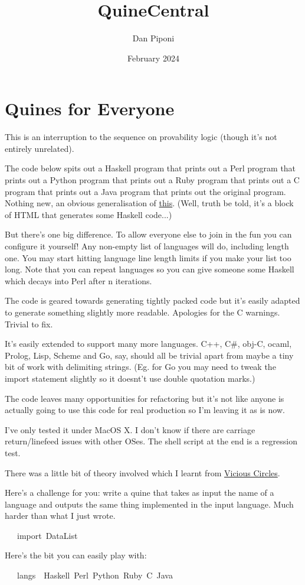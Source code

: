 \documentclass[12pt]{article}
\title{QuineCentral}
\author{Dan Piponi}
\date{February 2024}
\begin{document}
\section{Quines for Everyone}
This is an interruption to the sequence on provability logic (though it's not entirely unrelated).

The code below spits out a Haskell program that prints out a Perl program that prints out a Python program that prints out a Ruby program that prints out a C program that prints out a Java program that prints out the original program. Nothing new, an obvious generalisation of \href{http://blog.sigfpe.com/2008/02/third-order-quine-in-three-languages.html}{this}. (Well, truth be told, it's a block of HTML that generates some Haskell code...)

But there's one big difference. To allow everyone else to join in the fun you can configure it yourself! Any non-empty list of languages will do, including length one. You may start hitting language line length limits if you make your list too long. Note that you can repeat languages so you can give someone some Haskell which decays into Perl after n iterations.

The code is geared towards generating tightly packed code but it's easily adapted to generate something slightly more readable. Apologies for the C warnings. Trivial to fix.

It's easily extended to support many more languages. C++, C\#, obj-C, ocaml, Prolog, Lisp, Scheme and Go, say, should all be trivial apart from maybe a tiny bit of work with delimiting strings. (Eg. for Go you may need to tweak the import statement slightly so it doesnt't use double quotation marks.)

The code leaves many opportunities for refactoring but it's not like anyone is actually going to use this code for real production so I'm leaving it as is now.

I've only tested it under MacOS X. I don't know if there are carriage return/linefeed issues with other OSes. The shell script at the end is a regression test.

There was a little bit of theory involved which I learnt from \href{https://web.stanford.edu/group/cslipublications/cslipublications/site/1575860082.shtml}{Vicious Circles}.

Here's a challenge for you: write a quine that takes as input the name of a language and outputs the same thing implemented in the input language. Much harder than what I just wrote.
\begin{tabbing}\ttfamily
~~~import~DataList
\end{tabbing}
Here's the bit you can easily play with:
\begin{tabbing}\ttfamily
~~~langs~~Haskell~Perl~Python~Ruby~C~Java
\end{tabbing}
\end{document}
